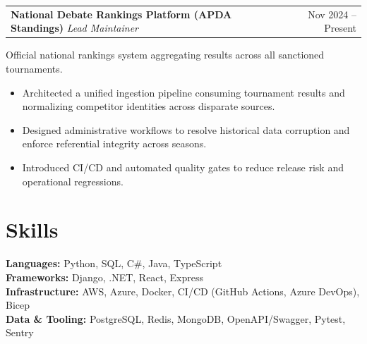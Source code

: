 \documentclass[11pt]{article}
\makeatletter
\newcommand{\BulletSize}{10}
\newcommand{\BulletLead}{12}
\newcommand{\BlurbSize}{10}
\newcommand{\BlurbLead}{12}
\newcommand{\BlurbPre}{0pt}
\newcommand{\BlurbPost}{-8pt}
\newcommand{\SkillsSize}{10}
\newcommand{\SkillsLead}{12}
\newcommand{\SkillsLabelWeight}{\bfseries}
\newenvironment{twocol}[2]{%
  \noindent\begin{tabular*}{\textwidth}{@{\extracolsep{\fill}} l r}
  #1 & #2\\
  \end{tabular*}\ignorespaces
}{\par}
\newenvironment{ResumeItemize}{%
  \begin{itemize}\fontsize{\BulletSize}{\BulletLead}\selectfont
}{%
  \end{itemize}
}
\newcommand{\ProjectBlurb}[1]{%
  \vspace*{\BlurbPre}%
  {\fontsize{\BlurbSize}{\BlurbLead}\selectfont #1}%
  \\[\BlurbPost]%
}
\newcommand{\SkillsLine}[2]{%
  {\fontsize{\SkillsSize}{\SkillsLead}\selectfont \SkillsLabelWeight #1: }%
  {\fontsize{\SkillsSize}{\SkillsLead}\selectfont #2}\\
}
\makeatother
\begin{document}
\begin{twocol}{\textbf{National Debate Rankings Platform (APDA Standings)} \;\textit{Lead Maintainer}}{Nov 2024 -- Present}\end{twocol}
\ProjectBlurb{Official national rankings system aggregating results across all sanctioned tournaments.}
\begin{ResumeItemize}
  \item Architected a unified ingestion pipeline consuming tournament results and normalizing competitor identities across disparate sources.
  \item Designed administrative workflows to resolve historical data corruption and enforce referential integrity across seasons.
  \item Introduced CI/CD and automated quality gates to reduce release risk and operational regressions.
\end{ResumeItemize}

\section{Skills}

\SkillsLine{Languages}{Python, SQL, C\#, Java, TypeScript}
\SkillsLine{Frameworks}{Django, .NET, React, Express}
\SkillsLine{Infrastructure}{AWS, Azure, Docker, CI/CD (GitHub Actions, Azure DevOps), Bicep}
\SkillsLine{Data \& Tooling}{PostgreSQL, Redis, MongoDB, OpenAPI/Swagger, Pytest, Sentry}
\enlargethispage{\footskip}
\end{document}

